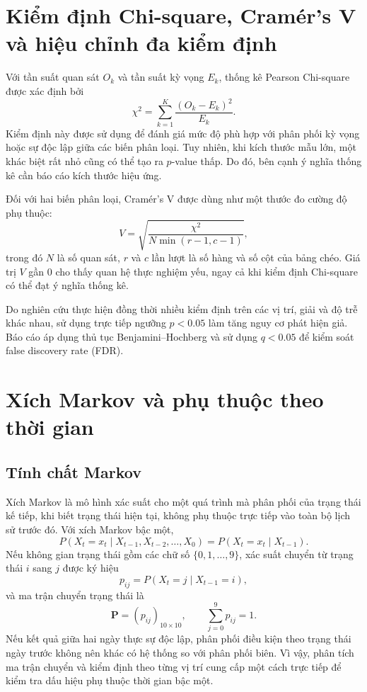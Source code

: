 \section{Kiểm định Chi-square, Cramér's V và hiệu chỉnh đa kiểm định}
Với tần suất quan sát $O_k$ và tần suất kỳ vọng $E_k$, thống kê Pearson Chi-square được xác định bởi
\[
\chi^2=\sum_{k=1}^{K}\frac{(O_k-E_k)^2}{E_k}.
\]
Kiểm định này được sử dụng để đánh giá mức độ phù hợp với phân phối kỳ vọng hoặc sự độc lập giữa các biến phân loại. Tuy nhiên, khi kích thước mẫu lớn, một khác biệt rất nhỏ cũng có thể tạo ra $p$-value thấp. Do đó, bên cạnh ý nghĩa thống kê cần báo cáo kích thước hiệu ứng.

Đối với hai biến phân loại, Cramér's V được dùng như một thước đo cường độ phụ thuộc:
\[
V=\sqrt{\frac{\chi^2}{N\min(r-1,c-1)}},
\]
trong đó $N$ là số quan sát, $r$ và $c$ lần lượt là số hàng và số cột của bảng chéo. Giá trị $V$ gần 0 cho thấy quan hệ thực nghiệm yếu, ngay cả khi kiểm định Chi-square có thể đạt ý nghĩa thống kê.

Do nghiên cứu thực hiện đồng thời nhiều kiểm định trên các vị trí, giải và độ trễ khác nhau, sử dụng trực tiếp ngưỡng $p<0.05$ làm tăng nguy cơ phát hiện giả. Báo cáo áp dụng thủ tục Benjamini--Hochberg và sử dụng $q<0.05$ để kiểm soát false discovery rate (FDR).

\section{Xích Markov và phụ thuộc theo thời gian}
\subsection{Tính chất Markov}
Xích Markov là mô hình xác suất cho một quá trình mà phân phối của trạng thái kế tiếp, khi biết trạng thái hiện tại, không phụ thuộc trực tiếp vào toàn bộ lịch sử trước đó. Với xích Markov bậc một,
\[
P(X_t=x_t\mid X_{t-1},X_{t-2},\ldots,X_0)
=P(X_t=x_t\mid X_{t-1}).
\]
Nếu không gian trạng thái gồm các chữ số $\{0,1,\ldots,9\}$, xác suất chuyển từ trạng thái $i$ sang $j$ được ký hiệu
\[
p_{ij}=P(X_t=j\mid X_{t-1}=i),
\]
và ma trận chuyển trạng thái là
\[
\mathbf P=(p_{ij})_{10\times10},\qquad \sum_{j=0}^{9}p_{ij}=1.
\]
Nếu kết quả giữa hai ngày thực sự độc lập, phân phối điều kiện theo trạng thái ngày trước không nên khác có hệ thống so với phân phối biên. Vì vậy, phân tích ma trận chuyển và kiểm định theo từng vị trí cung cấp một cách trực tiếp để kiểm tra dấu hiệu phụ thuộc thời gian bậc một.

